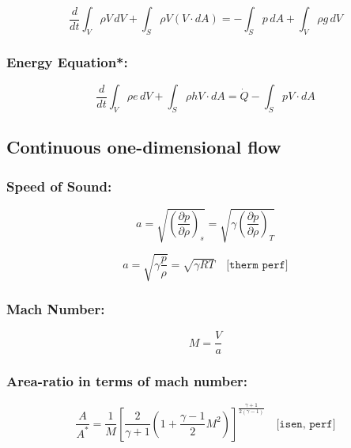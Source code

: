 \begin{equation*}
	\frac{d}{dt} \int_V \rho V \, dV + \int_S \rho V (V \cdot dA) = - \int_S p \, dA + \int_V \rho g \, dV
\end{equation*}

\subsubsection*{Energy Equation*:}

\begin{equation*}
	\frac{d}{dt} \int_V \rho e \, dV + \int_S \rho h V \cdot dA = \dot{Q} - \int_S p V \cdot dA
\end{equation*}

\subsection*{Continuous one-dimensional flow}

\subsubsection*{Speed of Sound:}

\begin{equation*}
	a = \sqrt{\left( \frac{\partial p}{\partial \rho} \right)_s} = \sqrt{\gamma \left( \frac{\partial p}{\partial \rho} \right)_T}
\end{equation*}

\begin{equation*}
	a = \sqrt{\gamma \frac{p}{\rho}} = \sqrt{\gamma RT} \quad \texttt{[therm perf]}
\end{equation*}

\subsubsection*{Mach Number:}

\begin{equation*}
	M = \frac{V}{a}
\end{equation*}

\subsubsection*{Area-ratio in terms of mach number:}
\begin{equation*}
	\frac{A}{A^*} = \frac{1}{M} \left[ \frac{2}{\gamma + 1} \left( 1 + \frac{\gamma - 1}{2} M^2 \right) \right]^{\frac{\gamma + 1}{2(\gamma - 1)}}
	\quad \texttt{[isen, perf]}     
\end{equation*}
